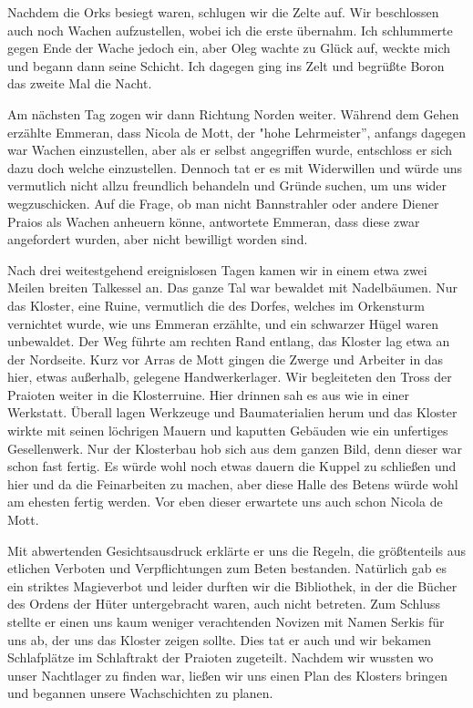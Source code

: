 Nachdem die Orks besiegt waren, schlugen wir die Zelte auf. Wir beschlossen auch noch Wachen aufzustellen, wobei ich die erste übernahm. Ich schlummerte gegen Ende der Wache jedoch ein, aber Oleg wachte zu Glück auf, weckte mich und begann dann seine Schicht. Ich dagegen ging ins Zelt und begrüßte Boron das zweite Mal die Nacht.\par
Am nächsten Tag zogen wir dann Richtung Norden weiter. Während dem Gehen erzählte Emmeran, dass Nicola de Mott, der "hohe Lehrmeister'', anfangs dagegen war Wachen einzustellen, aber als er selbst angegriffen wurde, entschloss er sich dazu doch welche einzustellen. Dennoch tat er es mit Widerwillen und würde uns vermutlich nicht allzu freundlich behandeln und Gründe suchen, um uns wider wegzuschicken. Auf die Frage, ob man nicht Bannstrahler oder andere Diener Praios als Wachen anheuern könne, antwortete Emmeran, dass diese zwar angefordert wurden, aber nicht bewilligt worden sind. \par

Nach drei weitestgehend ereignislosen Tagen kamen wir in einem etwa zwei Meilen breiten Talkessel an. Das ganze Tal war bewaldet mit Nadelbäumen. Nur das Kloster, eine Ruine, vermutlich die des Dorfes, welches im Orkensturm vernichtet wurde, wie uns Emmeran erzählte, und ein schwarzer Hügel waren unbewaldet. Der Weg führte am rechten Rand entlang, das Kloster lag etwa an der Nordseite. Kurz vor Arras de Mott gingen die Zwerge und Arbeiter in das hier, etwas außerhalb, gelegene Handwerkerlager. Wir begleiteten den Tross der Praioten weiter in die Klosterruine. Hier drinnen sah es aus wie in einer Werkstatt. Überall lagen Werkzeuge und Baumaterialien herum und das Kloster wirkte mit seinen löchrigen Mauern und kaputten Gebäuden wie ein unfertiges Gesellenwerk. Nur der Klosterbau hob sich aus dem ganzen Bild, denn dieser war schon fast fertig. Es würde wohl noch etwas dauern die Kuppel zu schließen und hier und da die Feinarbeiten zu machen, aber diese Halle des Betens würde wohl am ehesten fertig werden. Vor eben dieser erwartete uns auch schon Nicola de Mott. \par

Mit abwertenden Gesichtsausdruck erklärte er uns die Regeln, die größtenteils aus etlichen Verboten und Verpflichtungen zum Beten bestanden. Natürlich gab es ein striktes Magieverbot und leider durften wir die Bibliothek, in der die Bücher des Ordens der Hüter untergebracht waren, auch nicht betreten. Zum Schluss stellte er einen uns kaum weniger verachtenden Novizen mit Namen Serkis für uns ab, der uns das Kloster zeigen sollte. Dies tat er auch und wir bekamen Schlafplätze im Schlaftrakt der Praioten zugeteilt. Nachdem wir wussten wo unser Nachtlager zu finden war, ließen wir uns einen Plan des Klosters bringen und begannen unsere Wachschichten zu planen. \par

